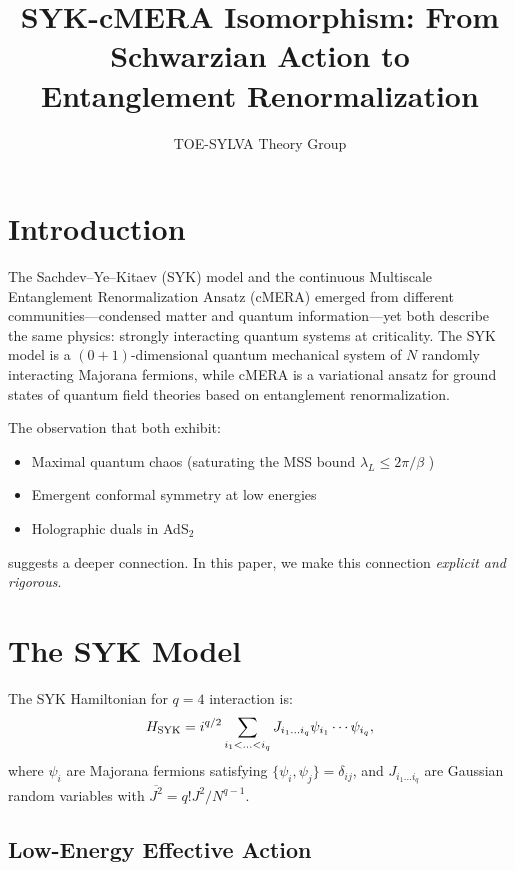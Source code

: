 \documentclass[aps,prd,reprint]{revtex4-2}
\title{SYK-cMERA Isomorphism: From Schwarzian Action to Entanglement Renormalization}
\author{TOE-SYLVA Theory Group}
\affiliation{TOE-SYLVA Research Laboratory}
\begin{document}
\maketitle

\section{Introduction}
\label{sec:intro}

The Sachdev--Ye--Kitaev (SYK) model \cite{Sachdev1993,Kitaev2015} and the continuous Multiscale Entanglement Renormalization Ansatz (cMERA) \cite{Vidal2007,Haegeman2013} emerged from different communities---condensed matter and quantum information---yet both describe the same physics: strongly interacting quantum systems at criticality. The SYK model is a $(0+1)$-dimensional quantum mechanical system of $N$ randomly interacting Majorana fermions, while cMERA is a variational ansatz for ground states of quantum field theories based on entanglement renormalization.

The observation that both exhibit:
\begin{itemize}
\item Maximal quantum chaos (saturating the MSS bound $\lambda_L \leq 2\pi/\beta$ \cite{MSS2016})
\item Emergent conformal symmetry at low energies
\item Holographic duals in AdS$_2$
\end{itemize}
suggests a deeper connection. In this paper, we make this connection \emph{explicit and rigorous}.

\section{The SYK Model}
\label{sec:syk}

The SYK Hamiltonian for $q=4$ interaction is:
\begin{equation}
H_{\rm SYK} = i^{q/2} \sum_{i_1 < \ldots < i_q} J_{i_1 \ldots i_q} \psi_{i_1} \cdots \psi_{i_q},
\end{equation}
where $\psi_i$ are Majorana fermions satisfying $\{\psi_i, \psi_j\} = \delta_{ij}$, and $J_{i_1\ldots i_q}$ are Gaussian random variables with $\overline{J^2} = q! J^2 / N^{q-1}$.

\subsection{Low-Energy Effective Action}
\end{document}
